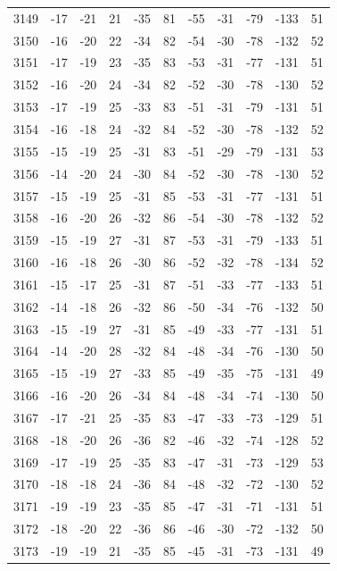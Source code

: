 \begin{table}[H]
\begin{tabular}{lllllllllll}
3149 & -17 & -21 & 21 & -35 & 81 & -55 & -31 & -79 & -133 & 51 \\
3150 & -16 & -20 & 22 & -34 & 82 & -54 & -30 & -78 & -132 & 52 \\
3151 & -17 & -19 & 23 & -35 & 83 & -53 & -31 & -77 & -131 & 51 \\
3152 & -16 & -20 & 24 & -34 & 82 & -52 & -30 & -78 & -130 & 52 \\
3153 & -17 & -19 & 25 & -33 & 83 & -51 & -31 & -79 & -131 & 51 \\
3154 & -16 & -18 & 24 & -32 & 84 & -52 & -30 & -78 & -132 & 52 \\
3155 & -15 & -19 & 25 & -31 & 83 & -51 & -29 & -79 & -131 & 53 \\
3156 & -14 & -20 & 24 & -30 & 84 & -52 & -30 & -78 & -130 & 52 \\
3157 & -15 & -19 & 25 & -31 & 85 & -53 & -31 & -77 & -131 & 51 \\
3158 & -16 & -20 & 26 & -32 & 86 & -54 & -30 & -78 & -132 & 52 \\
3159 & -15 & -19 & 27 & -31 & 87 & -53 & -31 & -79 & -133 & 51 \\
3160 & -16 & -18 & 26 & -30 & 86 & -52 & -32 & -78 & -134 & 52 \\
3161 & -15 & -17 & 25 & -31 & 87 & -51 & -33 & -77 & -133 & 51 \\
3162 & -14 & -18 & 26 & -32 & 86 & -50 & -34 & -76 & -132 & 50 \\
3163 & -15 & -19 & 27 & -31 & 85 & -49 & -33 & -77 & -131 & 51 \\
3164 & -14 & -20 & 28 & -32 & 84 & -48 & -34 & -76 & -130 & 50 \\
3165 & -15 & -19 & 27 & -33 & 85 & -49 & -35 & -75 & -131 & 49 \\
3166 & -16 & -20 & 26 & -34 & 84 & -48 & -34 & -74 & -130 & 50 \\
3167 & -17 & -21 & 25 & -35 & 83 & -47 & -33 & -73 & -129 & 51 \\
3168 & -18 & -20 & 26 & -36 & 82 & -46 & -32 & -74 & -128 & 52 \\
3169 & -17 & -19 & 25 & -35 & 83 & -47 & -31 & -73 & -129 & 53 \\
3170 & -18 & -18 & 24 & -36 & 84 & -48 & -32 & -72 & -130 & 52 \\
3171 & -19 & -19 & 23 & -35 & 85 & -47 & -31 & -71 & -131 & 51 \\
3172 & -18 & -20 & 22 & -36 & 86 & -46 & -30 & -72 & -132 & 50 \\
3173 & -19 & -19 & 21 & -35 & 85 & -45 & -31 & -73 & -131 & 49 \\

\end{tabular}
\end{table}
